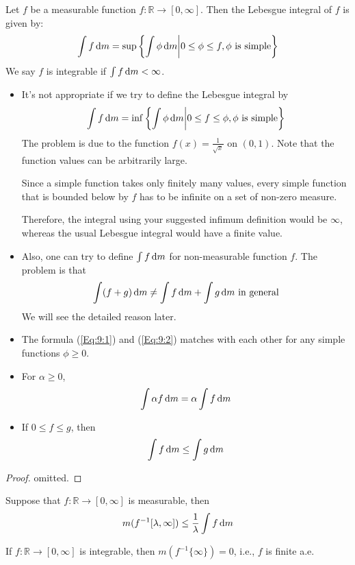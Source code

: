 \begin{definition}
Let $f$ be a measurable function $f:\mathbb{R}\to[0,\infty]$.
Then the Lebesgue integral of $f$ is given by:
\begin{equation}\label{Eq:9:1}
\int f\diff m = \sup\left\{\int\phi\diff m\middle| 0\le\phi\le f,\text{$\phi$ is simple}\right\}
\end{equation}
We say $f$ is integrable if $\int f\,\mathrm{d} m<\infty$.
\end{definition}
\begin{remark}
\begin{itemize}
\item
It's not appropriate if we try to define the Lebesgue integral by
\begin{equation}\label{Eq:9:2}
\int f\diff m = \inf\left\{\int\phi\diff m\middle| 0\le f\le \phi,\text{$\phi$ is simple}\right\}
\end{equation}
The problem is due to the function $f(x) = \frac{1}{\sqrt{x}}$ on $(0,1)$.
Note that the function values can be arbitrarily large.

Since a simple function takes only finitely many values, every simple function that is bounded below by $f$ has to be infinite on a set of non-zero measure.

Therefore, the integral using your suggested infimum definition would be $\infty$, whereas the usual Lebesgue integral would have a finite value.
\item
Also, one can try to define $\int f\,\mathrm{d} m$ for non-measurable function $f$. The problem is that 
\[
\int(f+g)\,\mathrm{d} m\ne\int f\,\mathrm{d} m+\int g\,\mathrm{d} m\text{ in general}
\]
We will see the detailed reason later.
\end{itemize}
\end{remark}

\begin{proposition}\label{pro:9:8}
\begin{itemize}
\item
The formula (\ref{Eq:9:1}) and (\ref{Eq:9:2}) matches with each other for any simple functions $\phi\ge0$.
\item
For $\alpha\ge0$,
\[
\int\alpha f\,\mathrm{d} m=\alpha\int f\,\mathrm{d} m
\]
\item
If $0\le f\le g$, then
\[
\int f\,\mathrm{d} m\le\int g\,\mathrm{d} m
\]
\end{itemize}
\end{proposition}

\begin{proof}
omitted.
\end{proof}
\begin{proposition}
Suppose that $f:\mathbb{R}\to[0,\infty]$ is measurable, then 
\[
m(f^{-1}[\lambda,\infty])\le\frac{1}{\lambda}\int f\,\mathrm{d} m
\]
\end{proposition}
\begin{corollary}\label{cor:9:6}
If $f:\mathbb{R}\to[0,\infty]$ is integrable, then $m(f^{-1}\{\infty\})=0$, i.e., $f$ is finite a.e.
\end{corollary}


